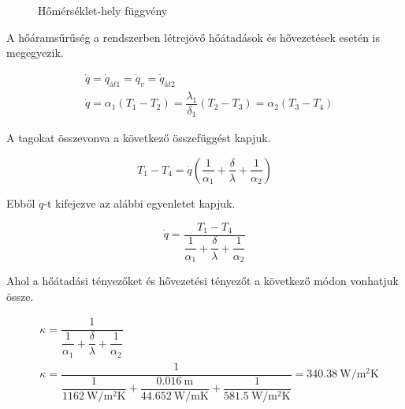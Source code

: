 \begin{figure}[h]
	\caption{Hőmérséklet-hely függvény}
\end{figure}

\noindent A hőáramsűrűség a rendszerben létrejövő hőátadások és hővezetések esetén is megegyezik. 

\begin{equation}\label{elso}
\begin{split}
&\dot{q}=\dot{q}_{\textit{át1}} =\dot{q}_v=\dot{q}_{\textit{át2}}\\&\dot{q}=\alpha_1 (T_1-T_2)= \dfrac{\lambda_1}{\delta_1} (T_2 - T_3) = \alpha_2 (T_3-T_4)
\end{split}
\end{equation} 

\noindent A tagokat összevonva a következő összefüggést kapjuk.

\begin{equation}
T_1-T_4=\dot{q}\left(\dfrac{1}{\alpha_1}+\dfrac{\delta}{\lambda}+\dfrac{1}{\alpha_2}\right)
\end{equation} 

\noindent Ebből $\dot{q}$-t kifejezve az alábbi egyenletet kapjuk.

\begin{equation}
\dot{q}=\dfrac{T_1-T_4}{\dfrac{1}{\alpha_1}+\dfrac{\delta}{\lambda}+\dfrac{1}{\alpha_2}}
\end{equation} 

\noindent Ahol a hőátadási tényezőket és hővezetési tényezőt a következő módon vonhatjuk össze.

\begin{equation}
\begin{split}
&\kappa=\dfrac{1}{\dfrac{1}{\alpha_1}+\dfrac{\delta}{\lambda}+\dfrac{1}{\alpha_2}}\\
&\kappa=\dfrac{1}{\dfrac{1}{\SI{1162}{\watt\per\meter\squared\kelvin}}+\dfrac{\SI {0,016}{\meter}}{\SI{44,652}{\watt\per\meter\kelvin}}+\dfrac{1}{\SI{581,5}{\watt\per\meter\squared\kelvin}}}
=\SI{340,38}{\watt\per\meter\squared\kelvin}
\end{split}
\end{equation} 

